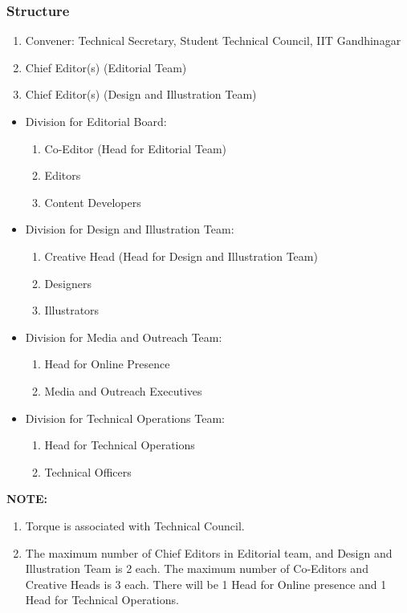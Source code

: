 \documentclass[12pt]{article}
\begin{document}
\subsubsection{Structure}
\begin{enumerate}
    \item Convener: Technical Secretary, Student Technical Council, IIT Gandhinagar 
    \item Chief Editor(s) (Editorial Team)
    \item Chief Editor(s) (Design and Illustration Team)
\end{enumerate}

\begin{itemize}
    \item Division for Editorial Board:
    \begin{enumerate}
        \item Co-Editor (Head for Editorial Team) 
        \item Editors 
        \item Content Developers 
    \end{enumerate}
    \item Division for Design and Illustration Team:
    \begin{enumerate}
        \item Creative Head (Head for Design and Illustration Team) 
        \item Designers
        \item Illustrators
    \end{enumerate}
    \item Division for Media and Outreach Team:
    \begin{enumerate}
        \item Head for Online Presence 
        \item Media and Outreach Executives 
    \end{enumerate}
    \item Division for Technical Operations Team:
    \begin{enumerate}
        \item Head for Technical Operations 
        \item Technical Officers
    \end{enumerate}
\end{itemize}

\noindent \textbf{NOTE:} \begin{enumerate}
    \item Torque is associated with Technical Council.
    \item The maximum number of Chief Editors in Editorial team, and Design and Illustration Team is 2 each. The maximum number of Co-Editors and Creative Heads is 3 each. There will be 1 Head for Online presence and 1 Head for Technical Operations.
\end{enumerate} 
\end{document}
